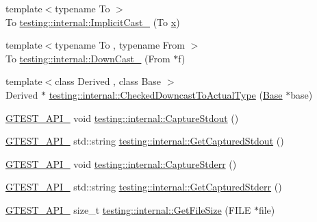 \begin{DoxyCompactItemize}
\item 
{\footnotesize template$<$typename To $>$ }\\To \mbox{\hyperlink{namespacetesting_1_1internal_a982df3f369643b175f79cda4048bc3b9}{testing\+::internal\+::\+Implicit\+Cast\+\_\+}} (To \mbox{\hyperlink{_obj__test_2lib_2googletest-master_2googlemock_2test_2gmock-matchers__test_8cc_a6150e0515f7202e2fb518f7206ed97dc}{x}})
\item 
{\footnotesize template$<$typename To , typename From $>$ }\\To \mbox{\hyperlink{namespacetesting_1_1internal_a1a1a1aed3fe00908b8a45d5ab4a33665}{testing\+::internal\+::\+Down\+Cast\+\_\+}} (From $\ast$f)
\item 
{\footnotesize template$<$class Derived , class Base $>$ }\\Derived $\ast$ \mbox{\hyperlink{namespacetesting_1_1internal_af54f5cf4d9e03836ecc0316d090cb4ed}{testing\+::internal\+::\+Checked\+Downcast\+To\+Actual\+Type}} (\mbox{\hyperlink{class_base}{Base}} $\ast$base)
\item 
\mbox{\hyperlink{_obj__test_2lib_2googletest-release-1_88_81_2googletest_2include_2gtest_2internal_2gtest-port_8h_aa73be6f0ba4a7456180a94904ce17790}{G\+T\+E\+S\+T\+\_\+\+A\+P\+I\+\_\+}} void \mbox{\hyperlink{namespacetesting_1_1internal_acba06d4f0343dec407738ba5544af990}{testing\+::internal\+::\+Capture\+Stdout}} ()
\item 
\mbox{\hyperlink{_obj__test_2lib_2googletest-release-1_88_81_2googletest_2include_2gtest_2internal_2gtest-port_8h_aa73be6f0ba4a7456180a94904ce17790}{G\+T\+E\+S\+T\+\_\+\+A\+P\+I\+\_\+}} std\+::string \mbox{\hyperlink{namespacetesting_1_1internal_aed657219a9856a8d249a3230de0c54ce}{testing\+::internal\+::\+Get\+Captured\+Stdout}} ()
\item 
\mbox{\hyperlink{_obj__test_2lib_2googletest-release-1_88_81_2googletest_2include_2gtest_2internal_2gtest-port_8h_aa73be6f0ba4a7456180a94904ce17790}{G\+T\+E\+S\+T\+\_\+\+A\+P\+I\+\_\+}} void \mbox{\hyperlink{namespacetesting_1_1internal_a8ec00d458d0d442bd64af7b5f9c22dda}{testing\+::internal\+::\+Capture\+Stderr}} ()
\item 
\mbox{\hyperlink{_obj__test_2lib_2googletest-release-1_88_81_2googletest_2include_2gtest_2internal_2gtest-port_8h_aa73be6f0ba4a7456180a94904ce17790}{G\+T\+E\+S\+T\+\_\+\+A\+P\+I\+\_\+}} std\+::string \mbox{\hyperlink{namespacetesting_1_1internal_a374156401da17704099d0c33fa53adfb}{testing\+::internal\+::\+Get\+Captured\+Stderr}} ()
\item 
\mbox{\hyperlink{_obj__test_2lib_2googletest-release-1_88_81_2googletest_2include_2gtest_2internal_2gtest-port_8h_aa73be6f0ba4a7456180a94904ce17790}{G\+T\+E\+S\+T\+\_\+\+A\+P\+I\+\_\+}} size\+\_\+t \mbox{\hyperlink{namespacetesting_1_1internal_a06ca3f65f5e85c9ce7299b9e4cd52408}{testing\+::internal\+::\+Get\+File\+Size}} (F\+I\+LE $\ast$file)

\end{DoxyCompactItemize}
